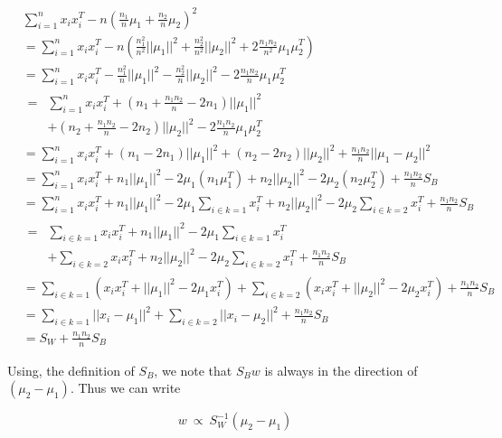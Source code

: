 \documentclass[10pt]{article}
\begin{document}
\begin{equation}
    \begin{aligned}
        &\sum_{i=1}^n x_ix_i^T - n\left(\frac{n_1}{n}\mu_1+\frac{n_2}{n}\mu_2\right)^2 \\
        &= \sum_{i=1}^n x_ix_i^T - n\left(\frac{n_1^2}{n^2}||\mu_1||^2 + \frac{n_2^2}{n^2}||\mu_2||^2 + 2 \frac{n_1n_2}{n^2}\mu_1\mu_2^T\right) \\
        &= \sum_{i=1}^n x_ix_i^T - \frac{n_1^2}{n}||\mu_1||^2 - \frac{n_2^2}{n}||\mu_2||^2 - 2 \frac{n_1n_2}{n}\mu_1\mu_2^T \\
        &\begin{aligned}
            =&\sum_{i=1}^n x_ix_i^T + \left(n_1 + \frac{n_1n_2}{n}-2n_1\right)||\mu_1||^2 \\
            &+ \left(n_2 + \frac{n_1n_2}{n}-2n_2\right)||\mu_2||^2 - 2\frac{n_1n_2}{n}\mu_1\mu_2^T
        \end{aligned} \\
        &= \sum_{i=1}^n x_ix_i^T + \left(n_1 - 2n_1\right)||\mu_1||^2 + \left(n_2 - 2n_2\right)||\mu_2||^2 + \frac{n_1n_2}{n}||\mu_1-\mu_2||^2 \\
        &= \sum_{i=1}^n x_ix_i^T + n_1 ||\mu_1||^2 - 2\mu_1\left(n_1\mu_1^T\right) + n_2 ||\mu_2||^2 - 2\mu_2\left(n_2\mu_2^T\right) + \frac{n_1n_2}{n}S_B \\
        &= \sum_{i=1}^n x_ix_i^T + n_1 ||\mu_1||^2 - 2\mu_1\sum_{i \in k=1}x_i^T + n_2 ||\mu_2||^2 - 2\mu_2\sum_{i \in k=2}x_i^T + \frac{n_1n_2}{n}S_B \\
        &\begin{aligned}
            =&\sum_{i \in k=1} x_ix_i^T + n_1 ||\mu_1||^2 - 2\mu_1\sum_{i \in k=1}x_i^T \\
            &+ \sum_{i \in k=2} x_ix_i^T + n_2 ||\mu_2||^2 - 2\mu_2\sum_{i \in k=2}x_i^T  + \frac{n_1n_2}{n}S_B
        \end{aligned} \\
        &= \sum_{i \in k=1} \left(x_ix_i^T +||\mu_1||^2-2\mu_1x_i^T\right) + \sum_{i \in k=2} \left(x_ix_i^T +||\mu_2||^2-2\mu_2x_i^T\right) + \frac{n_1n_2}{n}S_B \\
        &= \sum_{i \in k=1} ||x_i - \mu_1||^2 + \sum_{i \in k=2} ||x_i - \mu_2||^2 + \frac{n_1n_2}{n}S_B \\
        &= S_W + \frac{n_1n_2}{n}S_B
    \end{aligned}
\end{equation}

\noindent Using, the definition of $S_B$, we note that $S_Bw$ is always in the direction of $\left(\mu_2-\mu_1\right)$. Thus we can write

\begin{equation}
    w \ \propto\ S_W^{-1}\left(\mu_2-\mu_1\right)
\end{equation}
\end{document}
